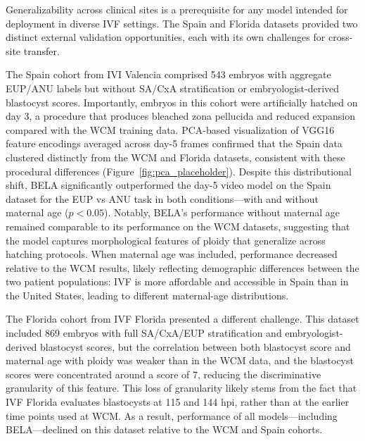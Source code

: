 \documentclass[11pt]{article}
\begin{document}
Generalizability across clinical sites is a prerequisite for any model intended for deployment in diverse IVF settings. The Spain and Florida datasets provided two distinct external validation opportunities, each with its own challenges for cross-site transfer.

The Spain cohort from IVI Valencia comprised 543 embryos with aggregate EUP/ANU labels but without SA/CxA stratification or embryologist-derived blastocyst scores. Importantly, embryos in this cohort were artificially hatched on day 3, a procedure that produces bleached zona pellucida and reduced expansion compared with the WCM training data. PCA-based visualization of VGG16 feature encodings averaged across day-5 frames confirmed that the Spain data clustered distinctly from the WCM and Florida datasets, consistent with these procedural differences (Figure~\ref{fig:pca_placeholder}). Despite this distributional shift, BELA significantly outperformed the day-5 video model on the Spain dataset for the EUP vs ANU task in both conditions---with and without maternal age ($p < 0.05$). Notably, BELA's performance without maternal age remained comparable to its performance on the WCM datasets, suggesting that the model captures morphological features of ploidy that generalize across hatching protocols. When maternal age was included, performance decreased relative to the WCM results, likely reflecting demographic differences between the two patient populations: IVF is more affordable and accessible in Spain than in the United States, leading to different maternal-age distributions.

The Florida cohort from IVF Florida presented a different challenge. This dataset included 869 embryos with full SA/CxA/EUP stratification and embryologist-derived blastocyst scores, but the correlation between both blastocyst score and maternal age with ploidy was weaker than in the WCM data, and the blastocyst scores were concentrated around a score of 7, reducing the discriminative granularity of this feature. This loss of granularity likely stems from the fact that IVF Florida evaluates blastocysts at 115 and 144 hpi, rather than at the earlier time points used at WCM. As a result, performance of all models---including BELA---declined on this dataset relative to the WCM and Spain cohorts.
\end{document}
